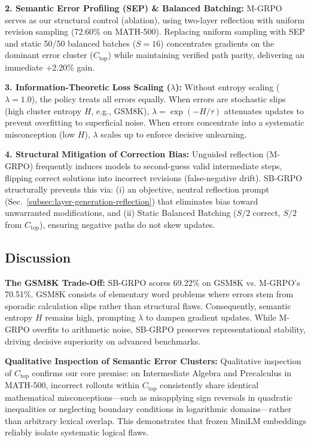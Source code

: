 \textbf{2. Semantic Error Profiling (SEP) \& Balanced Batching:} M-GRPO serves as our structural control (ablation), using two-layer reflection with uniform revision sampling (72.60\% on MATH-500). Replacing uniform sampling with SEP and static 50/50 balanced batches ($S=16$) concentrates gradients on the dominant error cluster ($C_{\text{top}}$) while maintaining verified path parity, delivering an immediate +2.20\% gain.

\textbf{3. Information-Theoretic Loss Scaling ($\lambda$):} Without entropy scaling ($\lambda=1.0$), the policy treats all errors equally. When errors are stochastic slips (high cluster entropy $H$, e.g., GSM8K), $\lambda = \exp(-H/\tau)$ attenuates updates to prevent overfitting to superficial noise. When errors concentrate into a systematic misconception (low $H$), $\lambda$ scales up to enforce decisive unlearning.

\textbf{4. Structural Mitigation of Correction Bias:} Unguided reflection (M-GRPO) frequently induces models to second-guess valid intermediate steps, flipping correct solutions into incorrect revisions (false-negative drift). SB-GRPO structurally prevents this via: (i) an objective, neutral reflection prompt (Sec.~\ref{subsec:layer-generation-reflection}) that eliminates bias toward unwarranted modifications, and (ii) Static Balanced Batching ($S/2$ correct, $S/2$ from $C_{\text{top}}$), ensuring negative paths do not skew updates.

\subsection{Discussion}\label{subsec:discussion}
\textbf{The GSM8K Trade-Off:} SB-GRPO scores 69.22\% on GSM8K vs. M-GRPO's 70.51\%. GSM8K consists of elementary word problems where errors stem from sporadic calculation slips rather than structural flaws. Consequently, semantic entropy $H$ remains high, prompting $\lambda$ to dampen gradient updates. While M-GRPO overfits to arithmetic noise, SB-GRPO preserves representational stability, driving decisive superiority on advanced benchmarks.

\textbf{Qualitative Inspection of Semantic Error Clusters:} Qualitative inspection of $C_{\text{top}}$ confirms our core premise: on Intermediate Algebra and Precalculus in MATH-500, incorrect rollouts within $C_{\text{top}}$ consistently share identical mathematical misconceptions---such as misapplying sign reversals in quadratic inequalities or neglecting boundary conditions in logarithmic domains---rather than arbitrary lexical overlap. This demonstrates that frozen MiniLM embeddings reliably isolate systematic logical flaws.